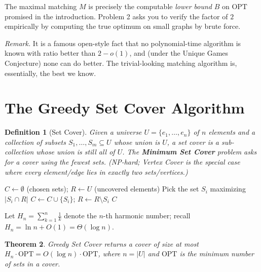 \documentclass[11pt]{article}
\newtheorem{theorem}{Theorem}[section]
\newtheorem{definition}[theorem]{Definition}
\begin{document}
The maximal matching $M$ is precisely the computable \emph{lower bound} $B$ on
$\mathrm{OPT}$ promised in the introduction. Problem 2 asks you to verify the factor of
$2$ empirically by computing the true optimum on small graphs by brute force.

\medskip
\noindent\emph{Remark.} It is a famous open-style fact that no polynomial-time algorithm
is known with ratio better than $2 - o(1)$, and (under the Unique Games Conjecture) none
can do better. The trivial-looking matching algorithm is, essentially, the best we know.

\section{The Greedy Set Cover Algorithm}

\begin{definition}[Set Cover]
Given a universe $U = \{e_1, \ldots, e_n\}$ of $n$ elements and a collection of subsets
$S_1, \ldots, S_m \subseteq U$ whose union is $U$, a \emph{set cover} is a sub-collection
whose union is still all of $U$. The \textbf{Minimum Set Cover} problem asks for a cover
using the fewest sets. (NP-hard; Vertex Cover is the special case where every element/edge
lies in exactly two sets/vertices.)
\end{definition}

\begin{algorithm}[h]
\caption{Greedy Set Cover (Problem 3)}
\begin{algorithmic}[1]
\State $C \gets \emptyset$ (chosen sets); $R \gets U$ (uncovered elements)
    \State Pick the set $S_i$ maximizing $|S_i \cap R|$ 
    \State $C \gets C \cup \{S_i\}$; \quad $R \gets R \setminus S_i$
\EndWhile
\State \Return $C$
\end{algorithmic}
\end{algorithm}

Let $H_n = \sum_{k=1}^{n} \tfrac{1}{k}$ denote the $n$-th harmonic number; recall $H_n =
\ln n + O(1) = \Theta(\log n)$.

\begin{theorem}
\label{thm:setcover}
Greedy Set Cover returns a cover of size at most $H_n \cdot \mathrm{OPT} = O(\log n)\cdot
\mathrm{OPT}$, where $n = |U|$ and $\mathrm{OPT}$ is the minimum number of sets in a
cover.
\end{theorem}
\end{document}
